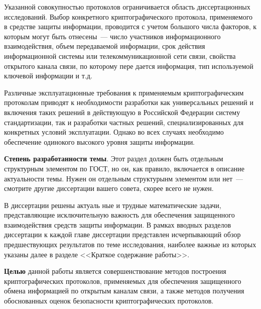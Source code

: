 \documentclass{cmcmsuthesis-phd}
\begin{document}
Указанной совокупностью протоколов ограничивается область диссертационных исследований.
Выбор конкретного криптографического протокола, применяемого в средстве защиты информации, проводится с учетом большого числа факторов, к которым могут быть отнесены~--- число участников информационного взаимодействия, объем передаваемой информации, срок действия информационной системы или телекоммуникационной сети связи, свойства открытого канала связи, по которому пере дается информация, тип используемой ключевой информации и т.д.

Различные эксплуатационные требования к применяемым криптографическим протоколам приводят к необходимости разработки как универсальных решений и включения таких решений в действующую в Российской Федерации систему стандартизации, так и разработки частных решений, специализированных для конкретных условий эксплуатации.
Однако во всех случаях необходимо обеспечение одинокого высокого уровня защиты информации.

\textbf{Степень разработанности темы}.
Этот раздел должен быть отдельным структурным элементом по ГОСТ, но он, как правило, включается в описание актуальности темы.
Нужен он отдельным структурынм элементом или нет~--- смотрите другие диссертации вашего совета, скорее всего не нужен.

В диссертации решены актуаль ные и трудные математические задачи, представляющие исключительную важность для обеспечения защищенного взаимодействия средств защиты информации.
В рамках вводных разделов диссертации к каждой главе диссертации представлен исчерпывающий обзор предшествующих результатов по теме исследования, наиболее важные из которых указаны далее в разделе {}<<Краткое содержание работы>>{}.

\textbf{Целью} данной работы является совершенствование методов построения криптографических протоколов, применяемых для обеспечения защищенного обмена информацией по открытым каналам связи, а также методов получения обоснованных оценок безопасности криптографических протоколов.
\end{document}
